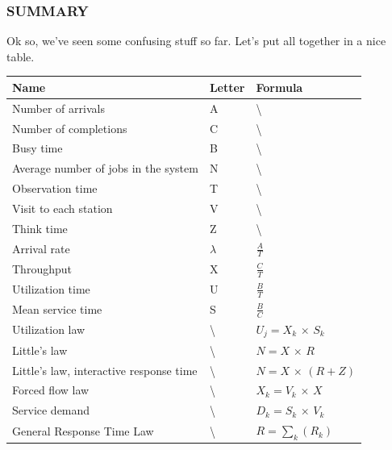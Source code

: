 \documentclass{article}
\begin{document}
				\subsubsection{SUMMARY}
					Ok so, we've seen some confusing stuff so far. Let's put all together in a nice table.
					\begin{center}
						\begin{longtable}{ | m{} || m{0.2\textwidth} | m{} | }
							\hline
							Name & Letter & Formula \\
							\hline
							\hline
							Number of arrivals & A & \textbackslash \\
							\hline
							Number of completions & C & \textbackslash \\
							\hline
							Busy time & B & \textbackslash \\
							\hline
							Average number of jobs in the system & N & \textbackslash \\
							\hline
							Observation time & T & \textbackslash \\
							\hline
							Visit to each station & V & \textbackslash \\
							\hline
							Think time & Z & \textbackslash \\
							\hline
							Arrival rate & $\lambda$ & $\frac{A}{T}$ \\
							\hline
							Throughput & X & $\frac{C}{T}$ \\
							\hline
							Utilization time & U & $\frac{B}{T}$ \\
							\hline
							Mean service time & S & $\frac{B}{C}$ \\
							\hline
							Utilization law & \textbackslash & $ U_j = X_k \,\times\, S_k$ \\
							\hline
							Little's law & \textbackslash & $ N = X \,\times\, R $ \\
							\hline
							Little's law, interactive response time & \textbackslash & $ N = X \,\times\,(R+Z) $ \\
							\hline
							Forced flow law & \textbackslash & $ X_k = V_k \,\times\, X $ \\
							\hline
							Service demand & \textbackslash & $ D_k = S_k \,\times\, V_k $ \\
							\hline
							General Response Time Law & \textbackslash & $ R = \sum_k(R_k) $ \\
							\hline
						\end{longtable}
					\end{center}
\end{document}
